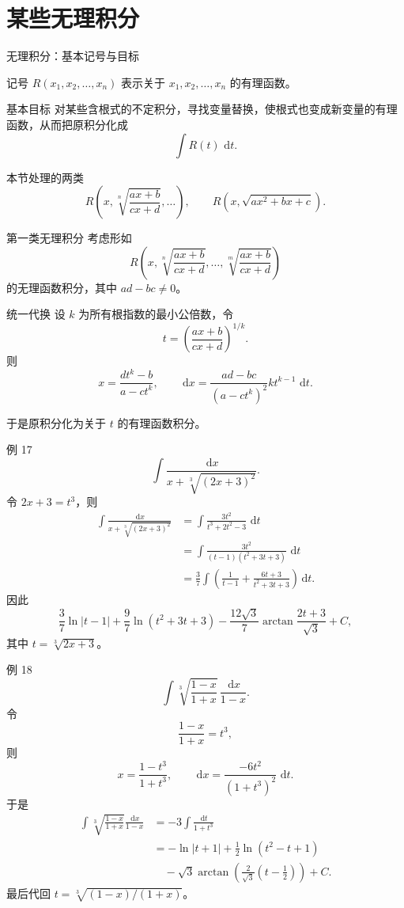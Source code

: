 \documentclass[aspectratio=169,10pt]{ctexbeamer}
\newcommand{\dd}{\,\mathrm{d}}
\begin{document}
\section{某些无理积分}

\begin{frame}[t]{无理积分：基本记号与目标}
\small
\begin{block}{记号}
$R(x_1,x_2,\ldots,x_n)$ 表示关于 $x_1,x_2,\ldots,x_n$ 的有理函数。
\end{block}

\begin{block}{基本目标}
对某些含根式的不定积分，寻找变量替换，使根式也变成新变量的有理函数，从而把原积分化成
\[
  \int R(t)\,\dd t.
\]
\end{block}

\begin{block}{本节处理的两类}
\[
R\left(x,\sqrt[n]{\frac{ax+b}{cx+d}},\ldots\right),
\qquad
R(x,\sqrt{ax^2+bx+c}).
\]
\end{block}
\end{frame}

\begin{frame}[t]{第一类无理积分}
\small
考虑形如
\[
  R\left(x,\sqrt[n]{\frac{ax+b}{cx+d}},\ldots,
  \sqrt[m]{\frac{ax+b}{cx+d}}\right)
\]
的无理函数积分，其中 $ad-bc\ne0$。

\begin{block}{统一代换}
设 $k$ 为所有根指数的最小公倍数，令
\[
  t=\left(\frac{ax+b}{cx+d}\right)^{1/k}.
\]
则
\[
  x=\frac{dt^k-b}{a-ct^k},\qquad
  \dd x=\frac{ad-bc}{(a-ct^k)^2}kt^{k-1}\,\dd t.
\]
\end{block}
于是原积分化为关于 $t$ 的有理函数积分。
\end{frame}

\begin{frame}[t]{例 17}
\small
\[
  \int\frac{\dd x}{x+\sqrt[3]{(2x+3)^2}}.
\]
令 $2x+3=t^3$，则
\[
\begin{aligned}
\int\frac{\dd x}{x+\sqrt[3]{(2x+3)^2}}
&=\int\frac{3t^2}{t^3+2t^2-3}\,\dd t\\
&=\int\frac{3t^2}{(t-1)(t^2+3t+3)}\,\dd t\\
&=\frac37\int\left(\frac1{t-1}+\frac{6t+3}{t^2+3t+3}\right)\dd t.
\end{aligned}
\]
因此
\[
  \frac37\ln|t-1|+\frac97\ln(t^2+3t+3)
  -\frac{12\sqrt3}{7}\arctan\frac{2t+3}{\sqrt3}+C,
\]
其中 $t=\sqrt[3]{2x+3}$。
\end{frame}

\begin{frame}[t]{例 18}
\small
\[
  \int \sqrt[3]{\frac{1-x}{1+x}}\,
  \frac{\dd x}{1-x}.
\]
令
\[
  \frac{1-x}{1+x}=t^3,
\]
则
\[
  x=\frac{1-t^3}{1+t^3},\qquad
  \dd x=\frac{-6t^2}{(1+t^3)^2}\,\dd t.
\]
于是
\[
\begin{aligned}
\int \sqrt[3]{\frac{1-x}{1+x}}\frac{\dd x}{1-x}
&=-3\int\frac{\dd t}{1+t^3}\\
&=-\ln|t+1|+\frac12\ln(t^2-t+1)\\
&\quad-\sqrt3\arctan\left(\frac2{\sqrt3}\left(t-\frac12\right)\right)+C.
\end{aligned}
\]
最后代回 $t=\sqrt[3]{(1-x)/(1+x)}$。
\end{frame}
\end{document}
